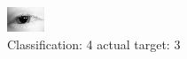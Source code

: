 \begin{figure}[h!]
\begin{center}
\includegraphics[width=0.60\columnwidth]{figures/ID93_class_4_target_3.png}
\end{center}
\caption{ Classification: 4 actual target: 3}
\label{fig:ID93_class_4_target_3}
\end{figure}
